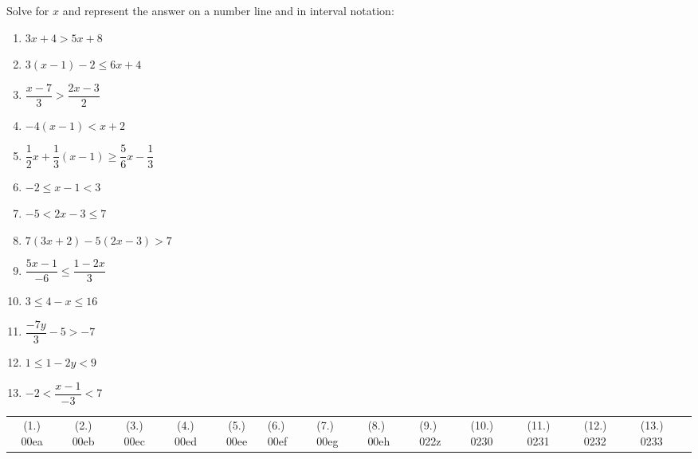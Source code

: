 \begin{exercises}{}
{Solve for $x$ and represent the answer on a number line and in interval notation:

\begin{enumerate}[itemsep=7pt, label=\textbf{\arabic*}. ] 
    \item $3x+4>5x+8$
    \item $3(x-1)-2\leq 6x+4$ 
    \item $\dfrac{x-7}{3}>\dfrac{2x-3}{2}$
    \item $-4(x-1)<x+2$
    \item $\dfrac{1}{2}x+\dfrac{1}{3}(x-1)\geq \dfrac{5}{6}x-\dfrac{1}{3}$ 
    \item $-2\leq x-1<3$ 
    \item $-5<2x-3\leq7$ 
\item $7(3x+2)-5(2x-3)>7$
\item $\dfrac{5x - 1}{-6} \leq \dfrac{1-2x}{3}$
\item $3 \leq 4 - x \leq 16$
\item $\dfrac{-7y}{3} - 5 > -7$
\item $1 \leq 1 - 2y < 9$
\item $-2 < \dfrac{x-1}{-3}<7$
    \end{enumerate}

\practiceinfo
\par 
\par \begin{tabular}[h]{ccccc}
(1.) 00ea&  (2.) 00eb&  (3.) 00ec& (4.) 00ed& (5.) 00ee& (6.) 00ef& (7.) 00eg& (8.) 00eh & (9.) 022z & (10.) 0230 
& (11.) 0231 & (12.) 0232 & (13.) 0233 &\end{tabular}
}
\end{exercises}


